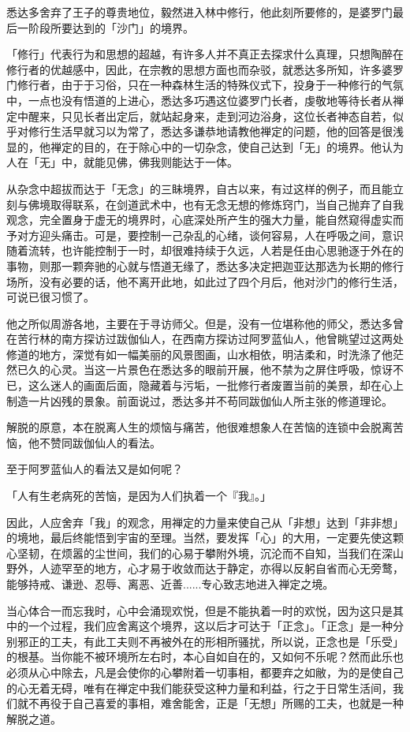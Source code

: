 \documentclass[twoside,openany]{book}
\begin{document}
悉达多舍弃了王子的尊贵地位，毅然进入林中修行，他此刻所要修的，是婆罗门最后一阶段所要达到的「沙门」的境界。

「修行」代表行为和思想的超越，有许多人并不真正去探求什么真理，只想陶醉在修行者的优越感中，因此，在宗教的思想方面也而杂驳，就悉达多所知，许多婆罗门修行者，由于于习俗，只在一种森林生活的特殊仪式下，投身于一种修行的气氛中，一点也没有悟道的上进心，悉达多巧遇这位婆罗门长者，虔敬地等待长者从禅定中醒来，只见长者出定后，就站起身来，走到河边浴身，这位长者神态自若，似乎对修行生活早就习以为常了，悉达多谦恭地请教他禅定的问题，他的回答是很浅显的，他禅定的目的，在于除心中的一切杂念，使自己达到「无」的境界。他认为人在「无」中，就能见佛，佛我则能达于一体。

从杂念中超拔而达于「无念」的三眛境界，自古以来，有过这样的例子，而且能立刻与佛境取得联系，在剑道武术中，也有无念无想的修炼窍门，当自己抛弃了自我观念，完全置身于虚无的境界时，心底深处所产生的强大力量，能自然窥得虚实而予对方迎头痛击。可是，要控制一己杂乱的心绪，谈何容易，人在呼吸之间，意识随着流转，也许能控制于一时，却很难持续于久远，人若是任由心思驰逐于外在的事物，则那一颗奔驰的心就与悟道无缘了，悉达多决定把迦亚达那选为长期的修行场所，没有必要的话，他不离开此地，如此过了四个月后，他对沙门的修行生活，可说已很习惯了。

他之所似周游各地，主要在于寻访师父。但是，没有一位堪称他的师父，悉达多曾在苦行林的南方探访过跋伽仙人，在西南方探访过阿罗蓝仙人，他曾眺望过这两处修道的地方，深觉有如一幅美丽的风景图画，山水相依，明洁柔和，时洗涤了他茫然已久的心灵。当这一片景色在悉达多的眼前开展，他不禁为之屏住呼吸，惊讶不已，这么迷人的画面后面，隐藏着与污垢，一批修行者废置当前的美景，却在心上制造一片凶残的景象。前面说过，悉达多并不苟同跋伽仙人所主张的修道理论。

解脱的原意，本在脱离人生的烦恼与痛苦，他很难想象人在苦恼的连锁中会脱离苦恼，他不赞同跋伽仙人的看法。

至于阿罗蓝仙人的看法又是如何呢？

「人有生老病死的苦恼，是因为人们执着一个『我』。」

因此，人应舍弃「我」的观念，用禅定的力量来使自己从「非想」达到「非非想」的境地，最后终能悟到宇宙的至理。当然，要发挥「心」的大用，一定要先使这颗心坚韧，在烦嚣的尘世间，我们的心易于攀附外境，沉沦而不自知，当我们在深山野外，人迹罕至的地方，心才易于收敛而达于静定，亦得以反躬自省而心无旁鹜，能够持戒、谦逊、忍辱、离恶、近善......专心致志地进入禅定之境。

当心体合一而忘我时，心中会涌现欢悦，但是不能执着一时的欢悦，因为这只是其中的一个过程，我们应舍离这个境界，这以后才可达于「正念」。「正念」是一种分别邪正的工夫，有此工夫则不再被外在的形相所骚扰，所以说，正念也是「乐受」的根基。当你能不被环境所左右时，本心自如自在的，又如何不乐呢？然而此乐也必须从心中除去，凡是会使你的心攀附着一切事相，都要弃之如敝，为的是使自己的心无着无碍，唯有在禅定中我们能获受这种力量和利益，行之于日常生活间，我们就不再役于自己喜爱的事相，难舍能舍，正是「无想」所赐的工夫，也就是一种解脱之道。
\end{document}
